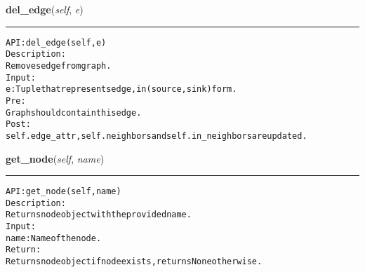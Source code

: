     \label{coinor:gimpy:graph:Graph:del_edge}

    \vspace{0.5ex}

\hspace{.8\funcindent}\begin{boxedminipage}{\funcwidth}

    \raggedright \textbf{del\_edge}(\textit{self}, \textit{e})

    \vspace{-1.5ex}

    \rule{\textwidth}{0.5\fboxrule}
\setlength{\parskip}{2ex}
\begin{alltt}

API: del\_edge(self, e)
Description:
Removes edge from graph.
Input:
    e: Tuple that represents edge, in (source,sink) form.
Pre:
    Graph should contain this edge.
Post:
    self.edge\_attr, self.neighbors and self.in\_neighbors are updated.
\end{alltt}

\setlength{\parskip}{1ex}
    \end{boxedminipage}

    \label{coinor:gimpy:graph:Graph:get_node}

    \vspace{0.5ex}

\hspace{.8\funcindent}\begin{boxedminipage}{\funcwidth}

    \raggedright \textbf{get\_node}(\textit{self}, \textit{name})

    \vspace{-1.5ex}

    \rule{\textwidth}{0.5\fboxrule}
\setlength{\parskip}{2ex}
\begin{alltt}

API: get\_node(self, name)
Description:
Returns node object with the provided name.
Input:
    name: Name of the node.
Return:
    Returns node object if node exists, returns None otherwise.
\end{alltt}

\setlength{\parskip}{1ex}
    \end{boxedminipage}

